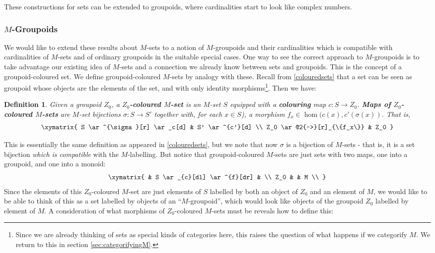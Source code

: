\documentclass{amsart} \usepackage{amsmath,amssymb,bbm}
\newtheorem{definition}{Definition}
\begin{document}
These constructions for sets can be extended to groupoids, where
cardinalities start to look like complex numbers.

\subsubsection{$M$-Groupoids}

We would like to extend these results about $M$-sets to a notion of
$M$-groupoids and their cardinalities which is compatible with
cardinalities of $M$-sets and of ordinary groupoids in the suitable
special cases.  One way to see the correct approach to $M$-groupoids
is to take advantage our existing idea of $M$-sets and a connection we
already know between sets and groupoids.  This is the concept of a
groupoid-coloured set.  We define groupoid-coloured $M$-sets by
analogy with these.  Recall from \ref{colouredsets} that a set can be
seen as groupoid whose objects are the elements of the set, and with
only identity morphisms\footnote{Since we are already thinking of sets
as special kinds of categories here, this raises the question of what
happens if we categorify $M$.  We return to this in section
\ref{sec:categorifyingM}.}.  Then we have:

\begin{definition} 
  Given a groupoid $Z_0$, a \textbf{$Z_0$-coloured $M$-set} is an
  $M$-set $S$ equipped with a \textbf{colouring} map $c:S \rightarrow
  Z_0$.  \textbf{Maps of $Z_0$-coloured $M$-sets} are $M$-set
  bijections $\sigma: S \rightarrow S'$ together with, for each $x \in
  S$), a morphism $f_x \in \hom(c(x),c'(\sigma(x))$.  That is,
  \begin{equation}
   \xymatrix{
    S \ar^{\sigma}[r] \ar_c[d] & S' \ar^{c'}[d] \\
    Z_0 \ar@2{->}[r]_{\{f_x\}} & Z_0
   }
  \end{equation}
\end{definition}

This is essentially the same definition as appeared in
\ref{colouredsets}, but we note that now $\sigma$ is a bijection of
$M$-sets - that is, it is a set bijection \textit{which is compatible}
with the $M$-labelling.  But notice that groupoid-coloured $M$-sets
are just sets with two maps, one into a groupoid, and one into a
monoid:
\begin{equation}
\xymatrix{
   & S \ar_{c}[dl] \ar^{f}[dr] & \\
  Z_0 & & M \\
}
\end{equation}
Since the elements of this $Z_0$-coloured $M$-set are just elements of
$S$ labelled by both an object of $Z_0$ and an element of $M$, we
would like to be able to think of this as a set labelled by objects of
an ``$M$-groupoid'', which would look like objects of the groupoid
$Z_0$ labelled by element of $M$.  A consideration of what morphisms
of $Z_0$-coloured $M$-sets must be reveals how to define this:
\end{document}
